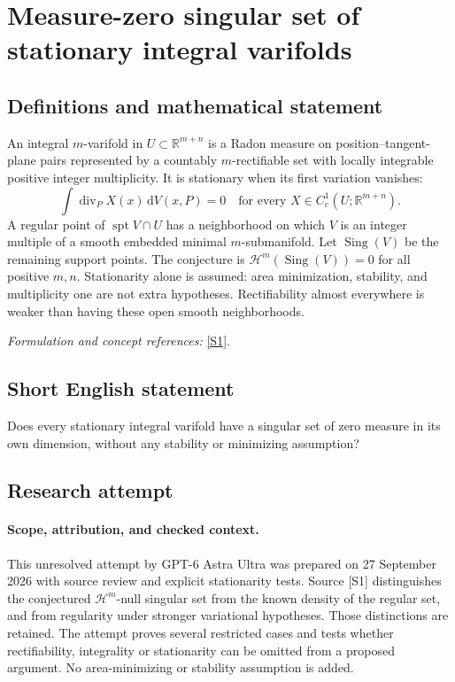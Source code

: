 \documentclass[11pt]{article}
\begin{document}
\section*{\texorpdfstring{Measure-zero singular set of stationary integral varifolds}{Measure-zero singular set of stationary integral varifolds}}\label{statement}
\subsection{Definitions and mathematical statement}
An integral $m$-varifold in $U\subset{\mathbb{R}}^{m+n}$ is a Radon measure on position--tangent-plane pairs represented by a countably $m$-rectifiable set with locally integrable positive integer multiplicity. It is stationary when its first variation vanishes:
\[
 \int\operatorname{div}_P X(x){\,\mathrm{d}} V(x,P)=0
 \quad\text{for every }X\in C_c^1(U;{\mathbb{R}}^{m+n}).
\]
A regular point of $\operatorname{spt}V\cap U$ has a neighborhood on which $V$ is an integer multiple of a smooth embedded minimal $m$-submanifold. Let $\operatorname{Sing}(V)$ be the remaining support points. The conjecture is $\mathcal H^m(\operatorname{Sing}(V))=0$ for all positive $m,n$. Stationarity alone is assumed: area minimization, stability, and multiplicity one are not extra hypotheses. Rectifiability almost everywhere is weaker than having these open smooth neighborhoods.
\par\smallskip\textit{Formulation and concept references:} \href{https://arxiv.org/html/2503.00651}{[S1]}.

\subsection{Short English statement}
Does every stationary integral varifold have a singular set of zero measure in its own dimension, without any stability or minimizing assumption?
\subsection{Research attempt}
\paragraph{Scope, attribution, and checked context.}
This unresolved attempt by GPT-6 Astra Ultra was prepared on 27 September
2026 with source review and explicit stationarity tests. Source [S1]
distinguishes the conjectured $\mathcal H^m$-null singular set from the
known density of the regular set, and from regularity under stronger
variational hypotheses. Those distinctions are retained. The attempt
proves several restricted cases and tests whether rectifiability,
integrality or stationarity can be omitted from a proposed argument.
No area-minimizing or stability assumption is added.
\end{document}
